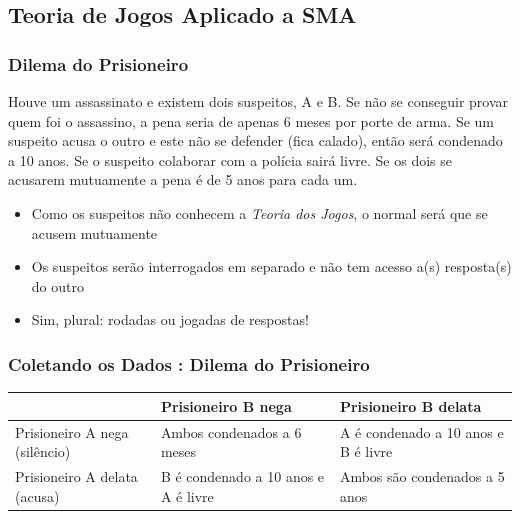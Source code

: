 \subsection{Teoria de Jogos Aplicado a SMA}
\begin{frame}

    \frametitle{Dilema do Prisioneiro}
   
    Houve um assassinato e existem dois suspeitos, A e B. Se não se conseguir provar quem foi o assassino, a 
pena seria de apenas 6 meses por porte de arma.
Se um suspeito acusa o outro e este não se defender (fica calado), então  será condenado a 10 anos.
Se o suspeito colaborar com a polícia sairá livre.
Se os dois se acusarem mutuamente a pena é de 5 anos para cada um.

\begin{itemize}
  
  \item Como os suspeitos não conhecem a \textit{Teoria dos Jogos}, o normal será que se acusem mutuamente
    
  \item Os suspeitos serão interrogados em separado e não tem acesso a(s) resposta(s) do outro

\item Sim, plural: rodadas ou jogadas de respostas!
\end{itemize}

   
\end{frame}


\begin{frame}

    \frametitle{Coletando os Dados : Dilema do Prisioneiro}
    
    
      \begin{center}
        \begin{tabular}{p{2cm} || p{3cm} | p{3cm}} \hline \hline
  & Prisioneiro B nega   &  Prisioneiro B delata   \\ \hline \hline
        Prisioneiro A nega (silêncio)  &  Ambos condenados a 6 meses  & A é condenado a 10 anos e B é livre   \\ \hline 
         Prisioneiro A delata (acusa)     & B é condenado a 10 anos e A é livre & Ambos são condenados a 5 anos \\ 
         \hline \hline
        \end{tabular}
      \end{center}

\end{frame}


